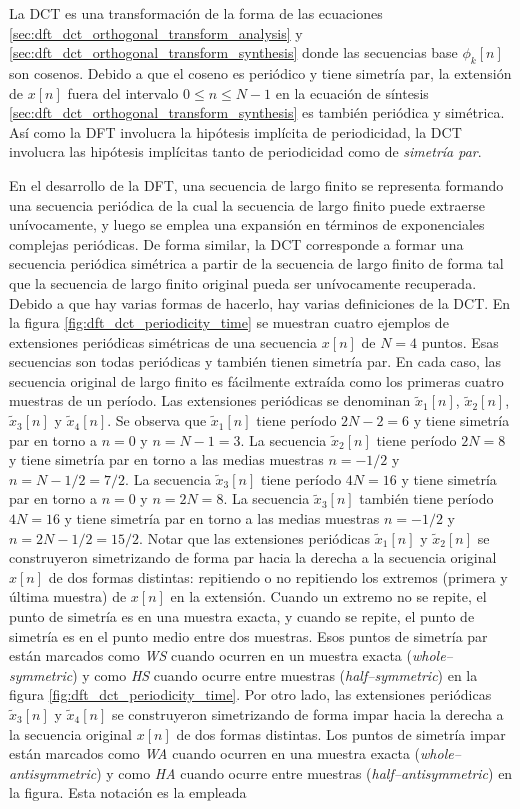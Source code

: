 \documentclass[a4paper]{report}
\begin{document}
La DCT es una transformación de la forma de las ecuaciones \ref{sec:dft_dct_orthogonal_transform_analysis} y \ref{sec:dft_dct_orthogonal_transform_synthesis} donde las secuencias base \(\phi_k[n]\) son cosenos. Debido a que el coseno es periódico y tiene simetría par, la extensión de \(x[n]\) fuera del intervalo \(0\leq n\leq N-1\) en la ecuación de síntesis \ref{sec:dft_dct_orthogonal_transform_synthesis} es también periódica y simétrica. Así como la DFT involucra la hipótesis implícita de periodicidad, la DCT involucra las hipótesis implícitas tanto de periodicidad como de \emph{simetría par}.

En el desarrollo de la DFT, una secuencia de largo finito se representa formando una secuencia periódica de la cual la secuencia de largo finito puede extraerse unívocamente, y luego se emplea una expansión en términos de  exponenciales complejas periódicas. De forma similar, la DCT corresponde a formar una secuencia periódica simétrica a partir de la secuencia de largo finito de forma tal que la secuencia de largo finito original pueda ser unívocamente recuperada. Debido a que hay varias formas de hacerlo, hay varias definiciones de la DCT. En la figura \ref{fig:dft_dct_periodicity_time} se muestran cuatro ejemplos de extensiones periódicas simétricas de una secuencia \(x[n]\) de \(N=4\) puntos. Esas secuencias son todas periódicas y también tienen simetría par. En cada caso, las secuencia original de largo finito es fácilmente extraída como los primeras cuatro muestras de un período. Las extensiones periódicas se denominan \(\tilde{x}_1[n]\), \(\tilde{x}_2[n]\), \(\tilde{x}_3[n]\) y \(\tilde{x}_4[n]\). Se observa que \(\tilde{x}_1[n]\) tiene período \(2N-2=6\) y tiene simetría par en torno a \(n=0\) y \(n=N-1=3\). La secuencia \(\tilde{x}_2[n]\) tiene período \(2N=8\) y tiene simetría par en torno a las medias muestras \(n=-1/2\) y \(n=N-1/2=7/2\). La secuencia \(\tilde{x}_3[n]\) tiene período \(4N=16\) y tiene simetría par en torno a \(n=0\) y \(n=2N=8\). La secuencia \(\tilde{x}_3[n]\) también tiene período \(4N=16\) y tiene simetría par en torno a las medias muestras \(n=-1/2\) y \(n=2N-1/2=15/2\). Notar que las extensiones periódicas \(\tilde{x}_1[n]\) y \(\tilde{x}_2[n]\) se construyeron simetrizando de forma par hacia la derecha a la secuencia original \(x[n]\) de dos formas distintas: repitiendo o no repitiendo los extremos (primera y última muestra) de \(x[n]\) en la extensión. Cuando un extremo no se repite, el punto de simetría es en una muestra exacta, y cuando  se repite, el punto de simetría es en el punto medio entre dos muestras. Esos puntos de simetría par están marcados como \emph{WS} cuando ocurren en un muestra exacta (\emph{whole--symmetric}) y como \emph{HS} cuando ocurre entre muestras (\emph{half--symmetric}) en la figura \ref{fig:dft_dct_periodicity_time}. Por otro lado, las extensiones periódicas \(\tilde{x}_3[n]\) y \(\tilde{x}_4[n]\) se construyeron simetrizando de forma impar hacia la derecha a la secuencia original \(x[n]\) de dos formas distintas. Los puntos de simetría impar están marcados como \emph{WA} cuando ocurren en una muestra exacta (\emph{whole--antisymmetric}) y como \emph{HA} cuando ocurre entre muestras (\emph{half--antisymmetric}) en la figura. Esta notación es la empleada 
\end{document}
